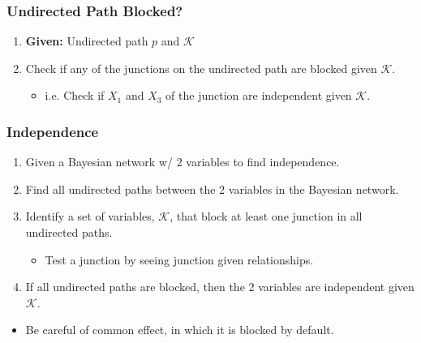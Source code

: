 \subsubsection{Undirected Path Blocked?}
\begin{process}
    \begin{enumerate}
        \item \textbf{Given:} Undirected path $p$ and $\mathcal{K}$
        \item Check if any of the junctions on the undirected path are blocked given $\mathcal{K}$.
        \begin{itemize}
            \item i.e. Check if $X_1$ and $X_3$ of the junction are independent given $\mathcal{K}$.
        \end{itemize}
    \end{enumerate}
\end{process}

\subsubsection{Independence}
\begin{process}
    \begin{enumerate}
        \item Given a Bayesian network w/ 2 variables to find independence.
        \item Find all undirected paths between the 2 variables in the Bayesian network.
        \item Identify a set of variables, $\mathcal{K}$, that block at least one junction in all undirected paths.
        \begin{itemize}
            \item Test a junction by seeing junction given relationships. 
        \end{itemize}
        \item If all undirected paths are blocked, then the 2 variables are independent given $\mathcal{K}$.
    \end{enumerate}
\end{process}

\begin{warning}
    \begin{itemize}
        \item Be careful of common effect, in which it is blocked by default. 
    \end{itemize}
\end{warning}

